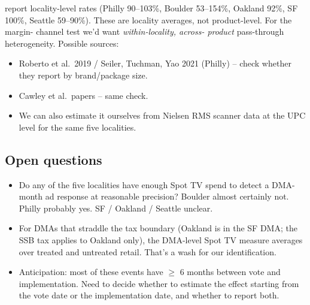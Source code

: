 \citet{keller_guyt_grewal_soda_marketing_conduct} report
locality-level rates (Philly 90--103\%, Boulder 53--154\%,
Oakland 92\%, SF 100\%, Seattle 59--90\%). These are
locality averages, not product-level. For the margin-
channel test we'd want \emph{within-locality, across-
product} pass-through heterogeneity. Possible sources:
\begin{itemize}
  \item Roberto et al.\ 2019 / Seiler, Tuchman, Yao 2021
        (Philly) -- check whether they report by
        brand/package size.
  \item Cawley et al.\ papers -- same check.
  \item We can also estimate it ourselves from Nielsen RMS
        scanner data at the UPC level for the same five
        localities.
\end{itemize}

\subsection*{Open questions}

\begin{itemize}
  \item Do any of the five localities have enough Spot TV
        spend to detect a DMA-month ad response at
        reasonable precision? Boulder almost certainly not.
        Philly probably yes. SF / Oakland / Seattle unclear.
  \item For DMAs that straddle the tax boundary (Oakland is
        in the SF DMA; the SSB tax applies to Oakland only),
        the DMA-level Spot TV measure averages over treated
        and untreated retail. That's a wash for our
        identification.
  \item Anticipation: most of these events have $\geq$ 6
        months between vote and implementation. Need to
        decide whether to estimate the effect starting from
        the vote date or the implementation date, and
        whether to report both.
\end{itemize}
